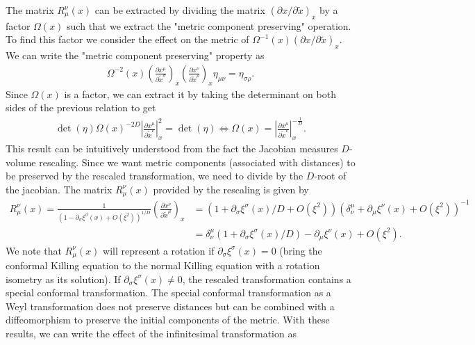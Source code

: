 \documentclass[10pt, a4paper]{article}
\begin{document}
{\begin{enumerate}
  The matrix $R_{\mu}^{\nu} (x)$ can be extracted by dividing the matrix $(\partial x/\partial \tilde{x})_{x}$ by a factor $\Omega(x)$ such that we extract the "metric component preserving" operation. To find this factor we consider the effect on the metric of $\Omega^{-1}(x)(\partial x/\partial \tilde{x})_{x}$. We can write the "metric component preserving" property as
  \begin{align*}
    \Omega^{-2}(x) \left(\frac{\partial x^{\mu}}{\partial \tilde{x}^\sigma}\right)_{x} \left(\frac{\partial x^\nu}{\partial \tilde{x}^{\rho}}\right)_{x} \eta_{\mu\nu} = \eta_{\sigma \rho}.
  \end{align*}
  Since $\Omega(x)$ is a factor, we can extract it by taking the determinant on both sides of the previous relation to get 
  \begin{align*}
    \det(\eta) \Omega(x)^{-2D} \left|\frac{\partial x^\mu }{\partial \tilde{x}^\nu}\right|_{x}^2 = \det(\eta) \iff \Omega(x) = \left|\frac{\partial x^\mu }{\partial \tilde{x}^\nu}\right|_{x}^{-\frac{1}{D}}.
  \end{align*}
  This result can be intuitively understood from the fact the Jacobian measures $D$-volume rescaling. Since we want metric components (associated with distances) to be preserved by the rescaled transformation, we need to divide by the $D$-root of the jacobian. The matrix $R_{\mu}^{\nu} (x)$ provided by the rescaling is given by 
  \begin{align*}
    R_{\mu}^{\nu} (x) = \frac{1}{(1- \partial_\sigma \xi^\sigma(x) + O(\xi^2))^{1/D}} \left(\frac{\partial x^\nu }{\partial \tilde{x}^\mu}\right)_{x} &= (1 + \partial_\sigma \xi^\sigma(x)/D + O(\xi^2))(\delta_\nu^\mu + \partial_\mu \xi^\nu(x) + O(\xi^2))^{-1}\\
    &= \delta_\nu^\mu(1 + \partial_\sigma \xi^\sigma(x)/D)  - \partial_\mu \xi^\nu(x) +  O(\xi^2). 
  \end{align*} 
  We note that $R_{\mu}^{\nu} (x)$ will represent a rotation if $\partial_\sigma \xi^\sigma(x) = 0$ (bring the conformal Killing equation to the normal Killing equation with a rotation isometry as its solution). If $\partial_\sigma \xi^\sigma(x) \neq 0$, the rescaled transformation contains a special conformal transformation. The special conformal transformation as a Weyl transformation does not preserve distances but can be combined with a diffeomorphism to preserve the initial components of the metric. With these results, we can write the effect of the infinitesimal transformation as 
  \begin{align*}

\end{align*}
\end{enumerate}}
\end{document}
